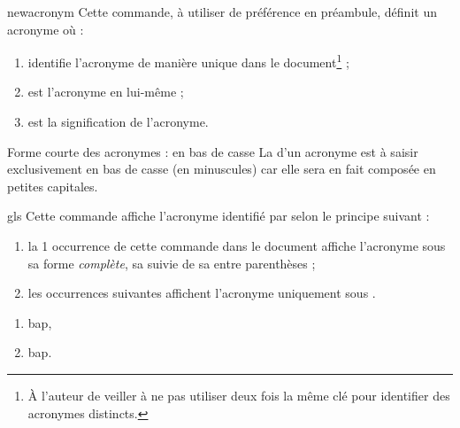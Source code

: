 \documentclass[french,nolocaltoc]{nwejmart}
\newtheorem[title=Fait,style=definition]{fact}
\begin{document}
\begin{docCommand}{newacronym}{}
  Cette commande, à utiliser de préférence en préambule, définit un acronyme
  où :
  \begin{enumerate}
  \item {} identifie l'acronyme de manière unique dans le
    document\footnote{À l'auteur de veiller à ne pas utiliser deux fois la même
      clé pour identifier des acronymes distincts.} ;
  \item {} est l'acronyme en lui-même ;
  \item {} est la signification de l'acronyme.
  \end{enumerate}
\begin{dbwarning}{Forme courte des acronymes : en bas de casse}{}
  La  d'un acronyme est à saisir exclusivement en bas de
  casse (en minuscules) car elle sera en fait composée en petites capitales.
\end{dbwarning}
\end{docCommand}

\begin{docCommand}{gls}{}
  Cette commande affiche l'acronyme identifié par  selon le principe
  suivant :
  \begin{enumerate}
  \item la 1\iere{} occurrence de cette commande dans le document affiche
    l'acronyme sous sa forme \emph{complète}, \ie*{} sa 
    suivie de sa  entre parenthèses ;
  \item les occurrences suivantes affichent l'acronyme uniquement sous
    .
  \end{enumerate}
\end{docCommand}

\begin{preamblecode}[listing options={alsolanguage={[glossaries]TeX}}]
\end{preamblecode}
\begin{bodycode}[listing and text,listing options={alsolanguage={[glossaries]TeX}}]
\begin{enumerate}
\item \gls{bap},
\item \gls{bap}.
\end{enumerate}
\end{bodycode}
\end{document}
